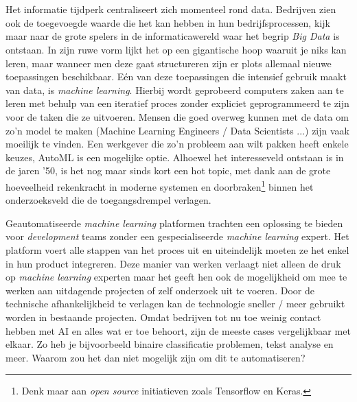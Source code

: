 
\chapter{}
\label{ch:inleiding}

Het informatie tijdperk centraliseert zich momenteel rond data. Bedrijven zien ook de toegevoegde waarde die het kan hebben in hun bedrijfsprocessen, kijk maar naar de grote spelers in de informaticawereld waar het begrip \textit{Big Data} is ontstaan. In zijn ruwe vorm lijkt het op een gigantische hoop waaruit je niks kan leren, maar wanneer men deze gaat structureren zijn er plots allemaal nieuwe toepassingen beschikbaar. 
Eén van deze toepassingen die intensief gebruik maakt van data, is \textit{machine learning}. Hierbij wordt geprobeerd computers zaken aan te leren met behulp van een iteratief proces zonder expliciet geprogrammeerd te zijn voor de taken die ze uitvoeren. Mensen die goed overweg kunnen met de data om zo'n model te maken (Machine Learning Engineers / Data Scientists ...)  zijn vaak moeilijk te vinden. Een werkgever die zo'n probleem aan wilt pakken heeft enkele keuzes, AutoML is een mogelijke optie. Alhoewel het interesseveld ontstaan is in de jaren '50, is het nog maar sinds kort een hot topic, met dank aan de grote hoeveelheid rekenkracht in moderne systemen en doorbraken\footnote{Denk maar aan \textit{open source} initiatieven zoals Tensorflow en Keras.} binnen het onderzoeksveld die de toegangsdrempel verlagen.

Geautomatiseerde \textit{machine learning} platformen trachten een oplossing te bieden voor \textit{development} teams zonder een gespecialiseerde \textit{machine learning} expert. Het platform voert alle stappen van het proces uit en uiteindelijk moeten ze het enkel in hun product integreren. Deze manier van werken verlaagt niet alleen de druk op \textit{machine learning} experten maar het geeft hen ook de mogelijkheid om mee te werken aan uitdagende projecten of zelf onderzoek uit te voeren. Door de technische afhankelijkheid te verlagen kan de technologie sneller / meer gebruikt worden in bestaande projecten. Omdat bedrijven tot nu toe weinig contact hebben met AI en alles wat er toe behoort, zijn de meeste cases vergelijkbaar met elkaar. Zo heb je bijvoorbeeld binaire classificatie problemen, tekst analyse en meer. Waarom zou het dan niet mogelijk zijn om dit te automatiseren? 

